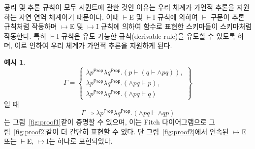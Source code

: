 \documentclass[10pt,twocolumn]{article}
\theoremstyle{definition}
\newtheorem{example}[theorem]{예시}
\newcommand{\Prop}{\mathsf{Prop}}
\begin{document}
공리 및 추론 규칙이 모두 시퀀트에 관한 것인 이유는 우리 체계가 가언적 추론을 지원하는 자연 연역 체계이기 때문이다. 이때 $\vdash$E 및 $\vdash$I 규칙에 의하여 $\vdash$ 구문이 추론 규칙처럼 작동하며 $\mapsto$E 및 $\mapsto$I 규칙에 의하여 함수로 표현한 스키마들이 스키마처럼 작동한다. 특히 $\vdash$I 규칙은 유도 가능한 규칙(derivable rule)을 유도할 수 있도록 하며, 이로 인하여 우리 체계가 가언적 추론을 지원하게 된다.

\begin{example} \label{example:proof}
	$$\Gamma = \left\{\begin{array}{l}
		\lambda p^\Prop\lambda q^\Prop.(p\vdash(q\vdash {\land}pq)),\\
		\lambda p^\Prop\lambda q^\Prop.({\land}pq\vdash p),\\
		\lambda p^\Prop\lambda q^\Prop.({\land}pq\vdash q)
	\end{array}\right\}$$
	일 때
	$$\Gamma\Rightarrow\lambda p^\Prop\lambda q^\Prop.({\land}pq\vdash{\land}qp)$$
	는 그림~\ref{fig:proof1}\과 같이 증명할 수 있으며, 이는 Fitch 다이어그램으로 그림~\ref{fig:proof2}\와 같이 더 간단히 표현할 수 있다. 단 그림~\ref{fig:proof2}에서 연속된 $\mapsto$E 또는 $\vdash$E, $\mapsto$I는 하나로 표현되었다.
	

\end{example}
\end{document}

